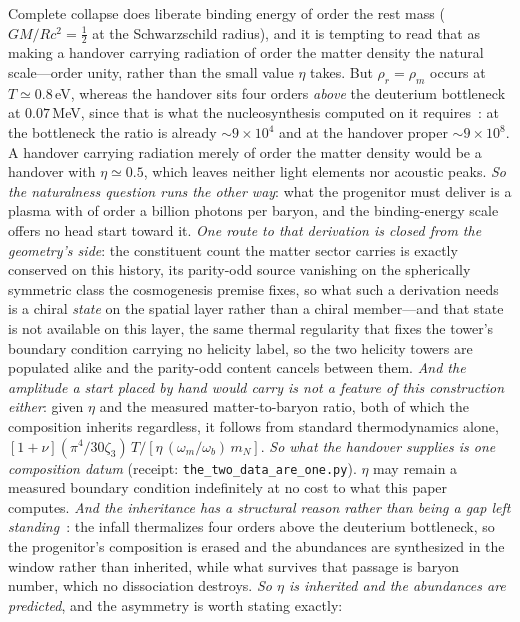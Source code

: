 \documentclass[11pt,a4paper]{article}
\theoremstyle{plain}
\theoremstyle{definition}
\theoremstyle{remark}
\begin{document}
Complete collapse does liberate binding energy of order the rest mass ($GM/Rc^2=\tfrac12$ at the Schwarzschild radius), and it is tempting to read that as making a handover carrying radiation of order the matter density the natural scale---order unity, rather than the small value $\eta$ takes. But $\rho_r=\rho_m$ occurs at $T\simeq0.8\,$eV, whereas the handover sits four orders \emph{above} the deuterium bottleneck at $0.07\,$MeV, since that is what the nucleosynthesis computed on it requires~\cite{JanzenCosmogenesis}: at the bottleneck the ratio is already ${\sim}9\times10^{4}$ and at the handover proper ${\sim}9\times10^{8}$. A handover carrying radiation merely of order the matter density would be a handover with $\eta\simeq0.5$, which leaves neither light elements nor acoustic peaks. \emph{So the naturalness question runs the other way}: what the progenitor must deliver is a plasma with of order a billion photons per baryon, and the binding-energy scale offers no head start toward it. \emph{One route to that derivation is closed from the geometry's side}: the constituent count the matter sector carries is exactly conserved on this history, its parity-odd source vanishing on the spherically symmetric class the cosmogenesis premise fixes, so what such a derivation needs is a chiral \emph{state} on the spatial layer rather than a chiral member---and that state is not available on this layer, the same thermal regularity that fixes the tower's boundary condition carrying no helicity label, so the two helicity towers are populated alike and the parity-odd content cancels between them. \emph{And the amplitude a start placed by hand would carry is not a feature of this construction either}: given $\eta$ and the measured matter-to-baryon ratio, both of which the composition inherits regardless, it follows from standard thermodynamics alone, $[1+\nu](\pi^4/30\zeta_3)\,T/[\eta\,(\omega_m/\omega_b)\,m_N]$. \emph{So what the handover supplies is one composition datum} (receipt: \texttt{the\_two\_data\_are\_one.py}). $\eta$ may remain a measured boundary condition indefinitely at no cost to what this paper computes. \emph{And the inheritance has a structural reason rather than being a gap left standing}~\cite{JanzenCRframework,JanzenCosmogenesis}: the infall thermalizes four orders above the deuterium bottleneck, so the progenitor's composition is erased and the abundances are synthesized in the window rather than inherited, while what survives that passage is baryon number, which no dissociation destroys. \emph{So $\eta$ is inherited and the abundances are predicted}, and the asymmetry is worth stating exactly:
\end{document}
